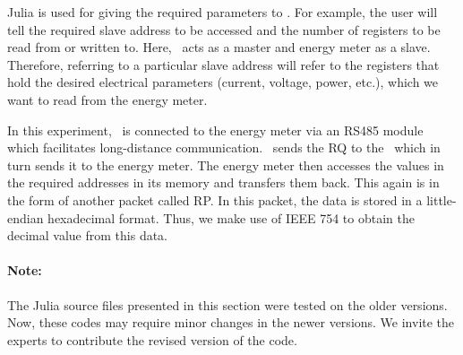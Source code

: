Julia is used for giving the required parameters to \arduino. For
example, the user will tell the required slave address to be accessed
and the number of registers to be read from or written to. Here,
\arduino\ acts as a master and energy meter as a slave. Therefore,
referring to a particular slave address will refer to the registers
that hold the desired electrical parameters (current, voltage, power, etc.), which we want to read from the energy meter.

In this experiment, \arduino\ is connected to the energy meter via an RS485 module which facilitates long-distance communication. 
\scilab\ sends the RQ to the \arduino\, which in turn sends it to the
energy meter. The energy meter then accesses the values in the
required addresses in its memory and transfers them back. This again
is in the form of another packet called RP. In this packet, the data is stored in a little-endian hexadecimal format. Thus, we make use of IEEE 754 to obtain the decimal value from this data. 

\paragraph{Note: } The Julia source files presented in this section were tested on the older versions. Now, these codes may require minor changes in
the newer versions. We invite the experts to contribute the revised version of the code.





